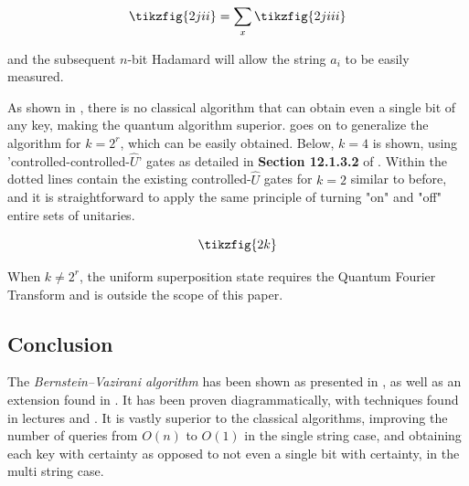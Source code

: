 \documentclass[11pt]{article} %
\theoremstyle{definition}
\begin{document}
\[\tikzfig{2jii}=\sum_x\tikzfig{2jiii}\]

and the subsequent $n$-bit Hadamard will allow the string $a_i$ to be easily measured.

As shown in \cite{Shukla_2023}, there is no classical algorithm that can obtain even a single bit of any key,
making the quantum algorithm superior. 
\cite{Shukla_2023} goes on to generalize the algorithm for $k=2^r$, 
which can be easily obtained. 
Below, $k=4$ is shown, using 'controlled-controlled-$\hat{U}$' gates 
as detailed in \textbf{Section 12.1.3.2} of \cite{coecke2017picturing}.
Within the dotted lines contain the existing controlled-$\hat{U}$ gates for $k=2$ similar to before,
and it is straightforward to apply the same principle of turning "on" and "off" entire sets of unitaries.

\[\tikzfig{2k}\]

When $k\neq2^r$, the uniform superposition state 
requires the Quantum Fourier Transform and is outside the scope of this paper.

\subsection*{Conclusion}

The \textit{Bernstein–Vazirani algorithm} has been shown as presented in 
\cite{Bernstein_1997}\cite{Terhal_1998}\cite{Du_2001}, as well as an extension found in \cite{Shukla_2023}.
It has been proven diagrammatically, with techniques found in lectures and \cite{coecke2017picturing}.
It is vastly superior to the classical algorithms, improving the number of queries from $O(n)$ to $O(1)$
in the single string case, and obtaining each key with certainty as opposed to not even a single bit with certainty,
in the multi string case.


\clearpage


\end{document}
